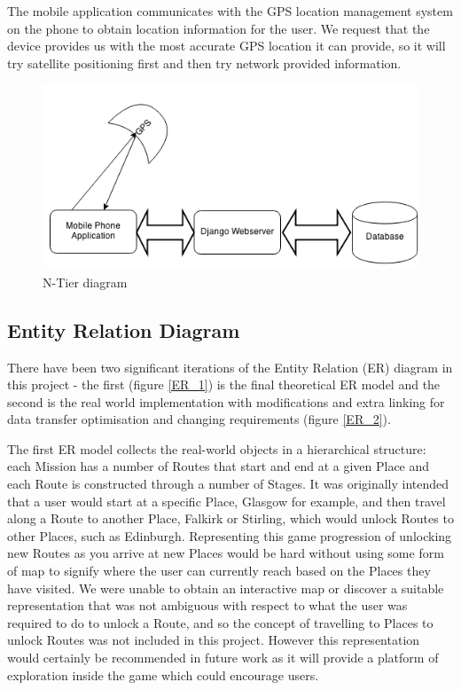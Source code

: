 The mobile application communicates with the GPS location
management system on the phone to obtain location information for the
user. We request that the device provides us with the most
accurate GPS location it can provide, so it will try satellite
positioning first and then try network provided information.
\begin{figure}[H]
  \centering
  \includegraphics[width=\textwidth]{images/N-tier.png}
  \caption{N-Tier diagram}
  \label{NTier}
\end{figure}

\subsection{Entity Relation Diagram}
\label{sec:ER}
There have been two significant iterations of the Entity Relation (ER)
diagram in this project - the first (figure \ref{ER_1}) is the final
theoretical ER model and the second is the real world implementation
with modifications and extra linking for data transfer optimisation
and changing requirements (figure \ref{ER_2}).

The first ER model collects the real-world objects in a hierarchical
structure: each Mission has a number of Routes that start and end at a
given Place and each Route is constructed through a number of
Stages. It was originally intended that a user would start at a
specific Place, Glasgow for example, and then travel along a Route to
another Place, Falkirk or Stirling, which would unlock Routes to other
Places, such as Edinburgh. Representing this game progression of
unlocking new Routes as you arrive at new Places would be hard without
using some form of map to signify where the user can currently reach
based on the Places they have visited. We were unable to obtain an
interactive map or discover a suitable representation that was not
ambiguous with respect to what the user was required to do to unlock a
Route, and so the concept of travelling to Places to unlock Routes was
not included in this project. However this representation would
certainly be recommended in future work as it will provide a platform
of exploration inside the game which could encourage users.

